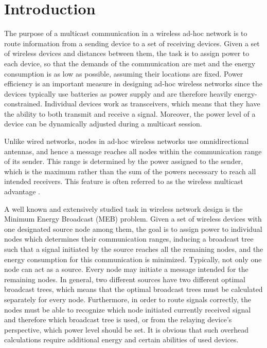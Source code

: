 \section{Introduction}

\label{intro}

The purpose of a multicast communication in a wireless ad-hoc network is to route information from a sending device to a set of receiving devices. Given a set of wireless devices and distances between them, the task is to assign power to each device, so that the demands of the communication are met and the energy consumption is as low as possible, assuming their locations are fixed. Power efficiency is an important measure in designing ad-hoc wireless networks since the devices typically use batteries as power supply and are therefore heavily energy-constrained. Individual devices work as transceivers, which means that they have the ability to both transmit and receive a signal. Moreover, the power level of a device can be dynamically adjusted during a multicast session.

Unlike wired networks, nodes in ad-hoc wireless networks use omnidirectional antennas, and hence a message reaches all nodes within the communication range of its sender. This range is determined by the power assigned to the sender, which is the maximum rather than the sum of the powers necessary to reach all intended receivers. This feature is often referred to as the wireless multicast advantage \cite{Wieseltier00onthe}. 

A well known and extensively studied task in wireless network design is the Minimum Energy Broadcast (MEB) problem. Given a set of wireless devices with one designated source node among them, the goal is to assign power to individual nodes  which determines their communication ranges, inducing a broadcast tree such that a signal initiated by the source reaches all the remaining nodes, and the energy consumption for this communication is minimized. Typically, not only one node can act as a source. Every node may initiate a message intended for the remaining nodes. In general, two different sources have two different optimal broadcast trees, which means that the optimal broadcast trees must be calculated separately for every node. Furthermore, in order to route signals correctly, the nodes must be able to recognize which node initiated currently received signal and therefore which broadcast tree is used, or from the relaying device's perspective, which power level should be set. It is obvious that such overhead calculations require additional energy and certain abilities of used devices.

